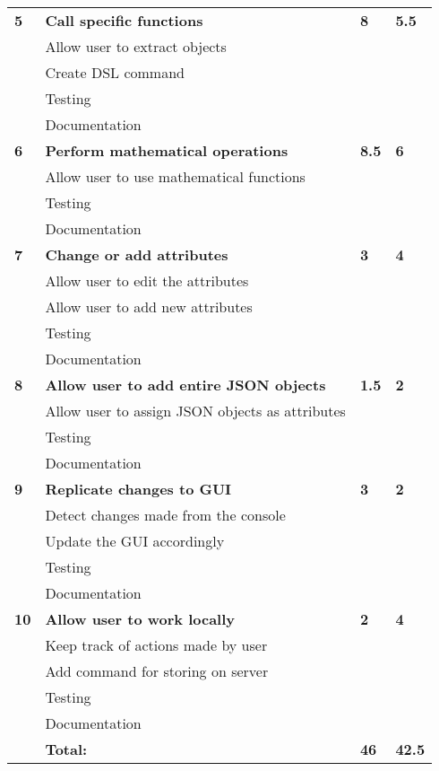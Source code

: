 \begin{table}
\begin{tabular}{ l p{8cm} l l }
 \bf{5}	  &\bf{Call specific functions}					&\bf{8}		&\bf{5.5}		     \\
		  &Allow user to extract objects				&			&		\\
		  &Create DSL command						&			&		\\
		  &Testing								&			&		\\
		  &Documentation							&			&		\\

\bf{6}	  &\bf{Perform mathematical operations}			&\bf{8.5}		&\bf{6}		     \\
		  &Allow user to use mathematical functions		&			&		\\
		  &Testing								&			&		\\
		  &Documentation							&			&		\\

\bf{7}   	&\bf{Change or add attributes}				&\bf{3}		&\bf{4}		     \\ 
		  &Allow user to edit the attributes				&			&		\\
		  &Allow user to add new attributes				&			&		\\
		  &Testing								&			&		\\
		  &Documentation							&			&		\\

\bf{8}   	&\bf{Allow user to add entire JSON objects}			&\bf{1.5}		&\bf{2}		     \\ 
		  &Allow user to assign JSON objects as attributes		&			&		\\
		  &Testing									&			&		\\
		  &Documentation								&			&		\\

\bf{9}   	&\bf{Replicate changes to GUI}				&\bf{3}		&\bf{2}		     \\ 
		  &Detect changes made from the console		&			&		\\
		  &Update the GUI accordingly					&			&		\\
		  &Testing								&			&		\\
		  &Documentation							&			&		\\

\bf{10}   	&\bf{Allow user to work locally}				&\bf{2}		&\bf{4}		     \\ 
		  &Keep track of actions made by user			&			&		\\
		  &Add command for storing on server			&			&		\\
		  &Testing								&			&		\\
		  &Documentation							&			&		\\

\hline 
		  &\bf{Total:}						&\bf{46}		&\bf{42.5}		\\
\hline
\end{tabular}
\label{table:sp3usrstories}
\end{table}



